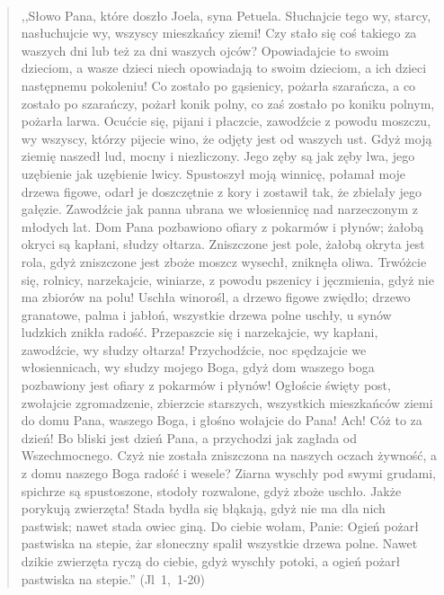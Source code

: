 \documentclass[10pt,a4paper,oneside]{article}
\begin{document}
\paragraph{}
\begin{quote}
,,Słowo Pana, które doszło Joela, syna Petuela. Słuchajcie tego wy, starcy, nasłuchujcie wy, wszyscy mieszkańcy ziemi! Czy stało się coś takiego za waszych dni lub też za dni waszych ojców? Opowiadajcie to swoim dzieciom, a wasze dzieci niech opowiadają to swoim dzieciom, a ich dzieci następnemu pokoleniu! Co zostało po gąsienicy, pożarła szarańcza, a co zostało po szarańczy, pożarł konik polny, co zaś zostało po koniku polnym, pożarła larwa. Ocućcie się, pijani i płaczcie, zawodźcie z powodu moszczu, wy wszyscy, którzy pijecie wino, że odjęty jest od waszych ust. Gdyż moją ziemię naszedł lud, mocny i niezliczony. Jego zęby są jak zęby lwa, jego uzębienie jak uzębienie lwicy. Spustoszył moją winnicę, połamał moje drzewa figowe, odarł je doszczętnie z kory i zostawił tak, że zbielały jego gałęzie. Zawodźcie jak panna ubrana we włosiennicę nad narzeczonym z młodych lat. Dom Pana pozbawiono ofiary z pokarmów i płynów; żałobą okryci są kapłani, słudzy ołtarza. Zniszczone jest pole, żałobą okryta jest rola, gdyż zniszczone jest zboże moszcz wysechł, zniknęła oliwa. Trwóżcie się, rolnicy, narzekajcie, winiarze, z powodu pszenicy i jęczmienia, gdyż nie ma zbiorów na polu! Uschła winorośl, a drzewo figowe zwiędło; drzewo granatowe, palma i jabłoń, wszystkie drzewa polne uschły, u synów ludzkich znikła radość. Przepaszcie się i narzekajcie, wy kapłani, zawodźcie, wy słudzy ołtarza! Przychodźcie, noc spędzajcie we włosiennicach, wy słudzy mojego Boga, gdyż dom waszego boga pozbawiony jest ofiary z pokarmów i płynów! Ogłoście święty post, zwołajcie zgromadzenie, zbierzcie starszych, wszystkich mieszkańców ziemi do domu Pana, waszego Boga, i głośno wołajcie do Pana! Ach! Cóż to za dzień! Bo bliski jest dzień Pana, a przychodzi jak zagłada od Wszechmocnego. Czyż nie została zniszczona na naszych oczach żywność, a z domu naszego Boga radość i wesele? Ziarna wyschły pod swymi grudami, spichrze są spustoszone, stodoły rozwalone, gdyż zboże uschło. Jakże porykują zwierzęta! Stada bydła się błąkają, gdyż nie ma dla nich pastwisk; nawet stada owiec giną. Do ciebie wołam, Panie: Ogień pożarł pastwiska na stepie, żar słoneczny spalił wszystkie drzewa polne. Nawet dzikie zwierzęta ryczą do ciebie, gdyż wyschły potoki, a ogień pożarł pastwiska na stepie.'' \mbox{(Jl 1, 1-20)}
\end{quote}
\end{document}
